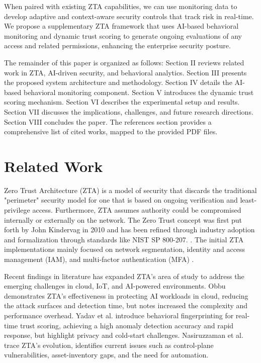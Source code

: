\documentclass[conference]{IEEEtran}
\begin{document}
When paired with existing ZTA capabilities, we can use monitoring data to develop adaptive and context-aware security controls that track risk in real-time. We propose a supplementary ZTA framework that uses AI-based behavioral monitoring and dynamic trust scoring to generate ongoing evaluations of any access and related permissions, enhancing the enterprise security posture.


The remainder of this paper is organized as follows: Section II reviews related work in ZTA, AI-driven security, and behavioral analytics. Section III presents the proposed system architecture and methodology. Section IV details the AI-based behavioral monitoring component. Section V introduces the dynamic trust scoring mechanism. Section VI describes the experimental setup and results. Section VII discusses the implications, challenges, and future research directions. Section VIII concludes the paper. The references section provides a comprehensive list of cited works, mapped to the provided PDF files.


\section{Related Work}

Zero Trust Architecture (ZTA) is a model of security that discards the traditional "perimeter" security model for one that is based on ongoing verification and least-privilege access. Furthermore, ZTA assumes authority could be compromised internally or externally on the network. The Zero Trust concept was first put forth by John Kindervag in 2010 and has been refined through industry adoption and formalization through standards like NIST SP 800-207. \cite{paper13}. The initial ZTA implementations mainly focused on network segmentation, identity and access management (IAM), and multi-factor authentication (MFA) \cite{paper3,paper12,paper13}.

Recent findings in literature has expanded ZTA’s area of study to address the emerging challenges in cloud, IoT, and AI-powered environments. Obbu \cite{paper1} demonstrates ZTA’s effectiveness in protecting AI workloads in cloud, reducing the attack surfaces and detection time, but notes increased the complexity and performance overhead. Yadav et al. \cite{paper2} introduce behavioral fingerprinting for real-time trust scoring, achieving a high anomaly detection accuracy and rapid response, but highlight privacy and cold-start challenges. Nasiruzzaman et al. \cite{paper3} trace ZTA’s evolution, identifies current issues such as control-plane vulnerabilities, asset-inventory gaps, and the need for automation.
\end{document}
